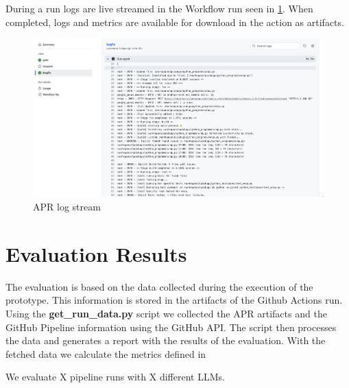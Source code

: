 During a run logs are live streamed in the Workflow run seen in \ref{fig:log-stream}.  When completed, logs and metrics are available for download in the action as artifacts.
\begin{figure}[H]
    \centering
    \includegraphics[width=1\textwidth]{images/workflow/logs.png}
    \caption{APR log stream}
    \label{fig:log-stream}
\end{figure}


\section{Evaluation Results}
The evaluation is based on the data collected during the execution of the prototype. This information is stored in the artifacts of the Github Actions run. Using the \textbf{get\_run\_data.py} script we collected the APR artifacts and the GitHub Pipeline information using the GitHub API. The script then processes the data and generates a report with the results of the evaluation. With the fetched data we calculate the metrics defined in %

We evaluate X pipeline runs with X different LLMs. 

